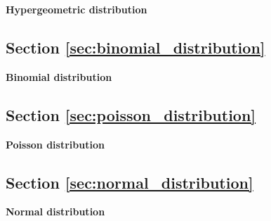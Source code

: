 \begin{exercise}
\label{ex:hyper}

\textbf{Hypergeometric distribution} 







\end{exercise}

\subsection{Section \ref{sec:binomial_distribution}}

\begin{exercise}
\label{ex:binom}

\textbf{Binomial distribution} 


\end{exercise}

\subsection{Section \ref{sec:poisson_distribution}}

\begin{exercise}
\label{ex:poiss}

\textbf{Poisson distribution} 





\end{exercise}

\subsection{Section \ref{sec:normal_distribution}}

\begin{exercise}
\label{ex:norm}

\textbf{Normal distribution} 





\end{exercise}

